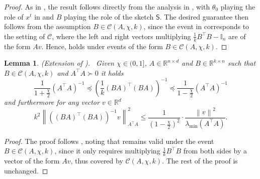 \documentclass[11pt]{article}
\newtheorem{lem}{Lemma}
\theoremstyle{definition}
\theoremstyle{plain}
\newcommand{\reals}{\mathbb{R}}
\providecommand{\brI}{\mathbb{I}}
\newcommand{\Norm}[1]{\left\| #1 \right\|}
\providecommand{\norm}[1]{\Norm{#1}}
\begin{document}
\begin{proof}
    As in \citet{lev2026near}, the result follows directly from the analysis in \citet[Appendix.~C]{pilanci_hessiansketch}, with $\theta_0$ playing the role of $x^t$ in \citet[Equation.~42]{pilanci_hessiansketch} and $B$ playing the role of the sketch $\mathsf{S}$. The desired guarantee then follows from the assumption $B\in \mathcal{C}(A,\chi,k)$, since the event in \citet[Equation.~43]{pilanci_hessiansketch} corresponds to the setting of $\mathcal{C}$, where the left and right vectors multiplying $\frac{1}{k}B^{\top}B-\brI_n$ are of the form $Av$. Hence, \citet[Equation.~44a]{pilanci_hessiansketch} holds under events of the form $B\in \mathcal{C}(A,\chi,k)$.
\end{proof}

\begin{lem}{(Extension of \citet[Lemma.~11]{lev2026near}).} \ 
    \label{lem:extend_lem_11}
    Given $\chi \in (0, 1]$, $A \in \reals^{n\times d}$ and $B \in \reals^{k\times n}$ such that $B \in \mathcal{C}(A, \chi, k)$ and $A^{\top}A\succ 0$ it holds  
    \begin{equation}
        \label{eq:PSD_Lemma_1}
        \frac{1}{1+\frac{\chi}{2}}\left(A^{\top}A\right)^{-1} \preceq \left(\frac{1}{k}(BA)^{\top}(BA)\right)^{-1} \preceq \frac{1}{1-\frac{\chi}{2}}\left(A^{\top}A\right)^{-1}
    \end{equation}
    and furthermore for any vector $v\in \reals^{d}$ 
    \begin{equation}
        \label{eq:PSD_Lemma_2}
        k^2\norm{\left((BA)^{\top}(BA)\right)^{-1}v}^2_{A^{\top}A} \leq \frac{1}{\left(1 - \frac{\chi}{2}\right)^{2}}\cdot \frac{\norm{v}^2}{\lambda_{\min}\left(A^{\top}A\right)}. 
    \end{equation}
\end{lem}
\begin{proof}
    The proof follows \citet[Lemma.~11]{lev2026near}, noting that \citet[Equation.~23]{lev2026near} remains valid under the event $B\in \mathcal{C}(A,\chi,k)$, since it only requires multiplying $\frac{1}{k}B^{\top}B$ from both sides by a vector of the form $Av$, thus covered by $\mathcal{C}(A,\chi,k)$. The rest of the proof is unchanged.
\end{proof}
\end{document}
